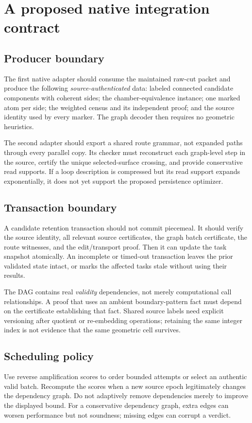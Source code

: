 \documentclass[11pt]{article}
\theoremstyle{definition}
\begin{document}
\section{A proposed native integration contract}\label{sec:integration}
\subsection{Producer boundary}
The first native adapter should consume the maintained raw-cut packet and produce the following \emph{source-authenticated} data: labeled connected candidate components with coherent sides; the chamber-equivalence instance; one marked atom per side; the weighted census and its independent proof; and the source identity used by every marker. The graph decoder then requires no geometric heuristics.

The second adapter should export a shared route grammar, not expanded paths through every parallel copy. Its checker must reconstruct each graph-level step in the source, certify the unique selected-surface crossing, and provide conservative read supports. If a loop description is compressed but its read support expands exponentially, it does not yet support the proposed persistence optimizer.

\subsection{Transaction boundary}
A candidate retention transaction should not commit piecemeal. It should verify the source identity, all relevant source certificates, the graph batch certificate, the route witnesses, and the edit/transport proof. Then it can update the task snapshot atomically. An incomplete or timed-out transaction leaves the prior validated state intact, or marks the affected tasks stale without using their results.

The DAG contains real \emph{validity} dependencies, not merely computational call relationships. A proof that uses an ambient boundary-pattern fact must depend on the certificate establishing that fact. Shared source labels need explicit versioning after quotient or re-embedding operations; retaining the same integer index is not evidence that the same geometric cell survives.

\subsection{Scheduling policy}
Use reverse amplification scores to order bounded attempts or select an authentic valid batch. Recompute the scores when a new source epoch legitimately changes the dependency graph. Do not adaptively remove dependencies merely to improve the displayed bound. For a conservative dependency graph, extra edges can worsen performance but not soundness; missing edges can corrupt a verdict.
\end{document}
